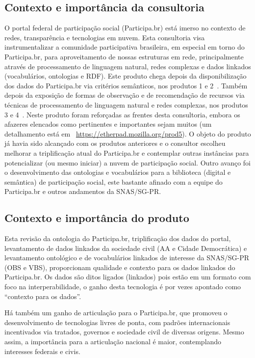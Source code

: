 \documentclass[12pt]{article}
\begin{document}
\subsection{Contexto e importância da consultoria}
O portal federal de participação social (Participa.br) está imerso no contexto de redes, transparência e tecnologias em nuvem. Esta consultoria visa instrumentalizar a comunidade participativa brasileira, em especial em torno do Participa.br, para aproveitamento de nossas estruturas em rede, principalmente através de processamento de linguagem natural, redes complexas e dados linkados (vocabulários, ontologias e RDF). Este produto chega depois da disponibilização dos dados do Participa.br via critérios semânticos, nos produtos 1 e 2~\cite{repoProd1,repoProd2}. Também depois da exposição de formas de observação e de recomendação de recursos via técnicas de processamento de linguagem natural e redes complexas, nos produtos 3 e 4~\cite{repoProd3,repoProd4}. Neste produto foram reforçadas as frentes desta consultoria, embora os afazeres elencados como pertinentes e importantes sejam muitos (um detalhamento está em ~\url{https://etherpad.mozilla.org/prod5}). O objeto do produto já havia sido alcançado com os produtos anteriores e o consultor escolheu melhorar a triplificação atual do Participa.br e contemplar outras instâncias para potencializar (ou mesmo iniciar) a nuvem de participação social. Outro avanço foi o desenvolvimento das ontologias e vocabulários para a biblioteca (digital e semântica) de participação social, este bastante afinado com a equipe do Participa.br e outros andamentos da SNAS/SG-PR.

\subsection{Contexto e importância do produto}
Esta revisão da ontologia do Participa.br, triplificação dos dados do portal, levantamento de dados linkados da sociedade civil (AA e Cidade Democrática) e levantamento ontológico e de vocabulários linkados de interesse da SNAS/SG-PR (OBS e VBS), proporcionam qualidade e contexto para os dados linkados do Participa.br. Os dados são ditos ligados (linkados) pois estão em um formato com foco na interperabilidade, o ganho desta tecnologia é por vezes apontado como ``contexto para os dados''.

Há também um ganho de articulação para o Participa.br, que promoveu o desenvolvimento de tecnologias livres de ponta, com padrões internacionais incentivados via tratados, governos e sociedade civil de diversas origens. Mesmo assim, a importância para a articulação nacional é maior, contemplando interesses federais e civis.
\end{document}

